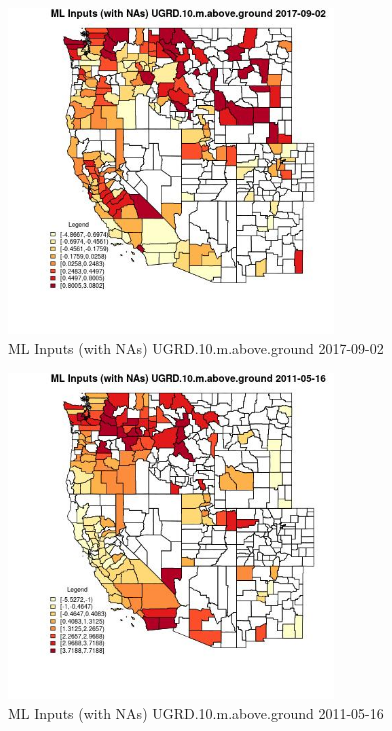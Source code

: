 \clearpage 

\begin{figure} 
\centering  
\includegraphics[width=0.77\textwidth]{Code_Outputs/Report_ML_input_PM25_Step4_part_e_de_duplicated_aves_compiled_2019-05-21wNAs_CountyUGRD10mabovegroundMean2017-09-02.jpg} 
\caption{\label{fig:Report_ML_input_PM25_Step4_part_e_de_duplicated_aves_compiled_2019-05-21wNAsCountyUGRD10mabovegroundMean2017-09-02}ML Inputs (with NAs) UGRD.10.m.above.ground 2017-09-02} 
\end{figure} 
 

\begin{figure} 
\centering  
\includegraphics[width=0.77\textwidth]{Code_Outputs/Report_ML_input_PM25_Step4_part_e_de_duplicated_aves_compiled_2019-05-21wNAs_CountyUGRD10mabovegroundMean2011-05-16.jpg} 
\caption{\label{fig:Report_ML_input_PM25_Step4_part_e_de_duplicated_aves_compiled_2019-05-21wNAsCountyUGRD10mabovegroundMean2011-05-16}ML Inputs (with NAs) UGRD.10.m.above.ground 2011-05-16} 
\end{figure} 
 

